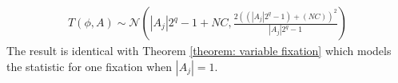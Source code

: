 \begin{eqnarray}
T\left(\phi,A\right) \sim \mathcal{N}\left(|A_j|2^q-1+NC,\frac{2((|A_j|2^q-1)+(NC))^2}{|A_j|2^q-1}\right)
\end{eqnarray}
The result is identical with Theorem \ref{theorem: variable fixation} which models the statistic for one fixation when $|A_j|=1$.
\fi